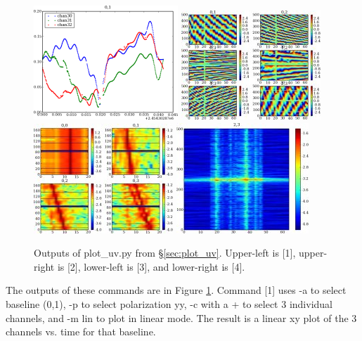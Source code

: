 \begin{figure}
\begin{center}
\includegraphics{plot_uv1.png}
\includegraphics{plot_uv2.jpg}\\
\includegraphics{plot_uv3.jpg}
\includegraphics{plot_uv4.jpg}\\
\caption{Outputs of plot\_uv.py from \S\ref{sec:plot_uv}. Upper-left is [1],
upper-right is [2], lower-left is [3], and lower-right is [4].}
\label{fig:plot_uv}
\end{center}
\end{figure}

The outputs of these commands are in Figure \ref{fig:plot_uv}.  Command [1]
uses -a to select baseline (0,1), -p to select polarization yy, -c with a + to
select 3 individual channels, and -m lin to plot in linear mode.  The result
is a linear xy plot of the 3 channels vs. time for that baseline.

